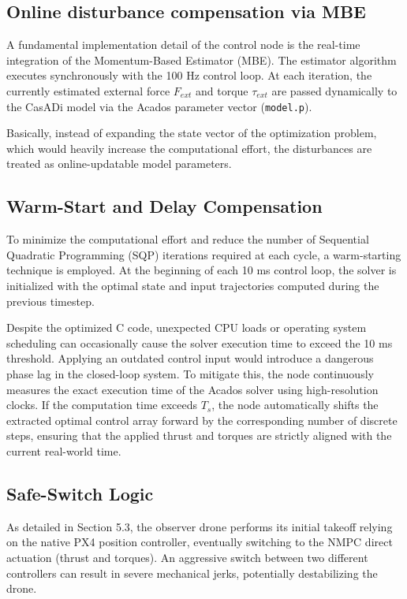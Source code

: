 \subsection{Online disturbance compensation via MBE}
A fundamental implementation detail of the control node is the real-time integration of the Momentum-Based Estimator (MBE). The estimator algorithm executes synchronously with the 100 Hz control loop. At each iteration, the currently estimated external force $F_{ext}$ and torque $\tau_{ext}$ are passed dynamically to the CasADi model via the Acados parameter vector (\texttt{model.p}). 

\noindent Basically, instead of expanding the state vector of the optimization problem, which would heavily increase the computational effort, the disturbances are treated as online-updatable model parameters.

\subsection{Warm-Start and Delay Compensation}
To minimize the computational effort and reduce the number of Sequential Quadratic Programming (SQP) iterations required at each cycle, a warm-starting technique is employed. At the beginning of each 10 ms control loop, the solver is initialized with the optimal state and input trajectories computed during the previous timestep. 

\noindent Despite the optimized C code, unexpected CPU loads or operating system scheduling can occasionally cause the solver execution time to exceed the 10 ms threshold. Applying an outdated control input would introduce a dangerous phase lag in the closed-loop system. To mitigate this, the node continuously measures the exact execution time of the Acados solver using high-resolution clocks. If the computation time exceeds $T_s$, the node automatically shifts the extracted optimal control array forward by the corresponding number of discrete steps, ensuring that the applied thrust and torques are strictly aligned with the current real-world time.

\subsection{Safe-Switch Logic}
As detailed in Section 5.3, the observer drone performs its initial takeoff relying on the native PX4 position controller, eventually switching to the NMPC direct actuation (thrust and torques). An aggressive switch between two different controllers can result in severe mechanical jerks, potentially destabilizing the drone.

